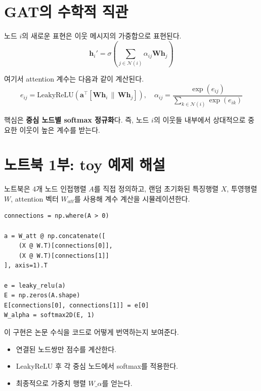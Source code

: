 \documentclass[11pt,a4paper]{article}
\begin{document}
\section{GAT의 수학적 직관}

노드 $i$의 새로운 표현은 이웃 메시지의 가중합으로 표현된다.
\[
\mathbf{h}_i' = \sigma\left(\sum_{j\in\mathcal{N}(i)} \alpha_{ij}\mathbf{W}\mathbf{h}_j\right)
\]

여기서 attention 계수는 다음과 같이 계산된다.
\[
e_{ij} = \text{LeakyReLU}(\mathbf{a}^{\top}[\mathbf{W}\mathbf{h}_i\,\|\,\mathbf{W}\mathbf{h}_j]),
\quad
\alpha_{ij}=\frac{\exp(e_{ij})}{\sum_{k\in\mathcal{N}(i)}\exp(e_{ik})}
\]

핵심은 \textbf{중심 노드별 softmax 정규화}다. 즉, 노드 $i$의 이웃들 내부에서 상대적으로 중요한 이웃이 높은 계수를 받는다.

\section{노트북 1부: toy 예제 해설}

노트북은 4개 노드 인접행렬 $A$를 직접 정의하고, 랜덤 초기화된 특징행렬 $X$, 투영행렬 $W$, attention 벡터 $W_{att}$를 사용해 계수 계산을 시뮬레이션한다.

\begin{lstlisting}
connections = np.where(A > 0)

a = W_att @ np.concatenate([
    (X @ W.T)[connections[0]],
    (X @ W.T)[connections[1]]
], axis=1).T

e = leaky_relu(a)
E = np.zeros(A.shape)
E[connections[0], connections[1]] = e[0]
W_alpha = softmax2D(E, 1)
\end{lstlisting}

이 구현은 논문 수식을 코드로 어떻게 번역하는지 보여준다.
\begin{itemize}[leftmargin=*]
  \item 연결된 노드쌍만 점수를 계산한다.
  \item LeakyReLU 후 각 중심 노드에서 softmax를 적용한다.
  \item 최종적으로 가중치 행렬 $W\_\alpha$를 얻는다.
\end{itemize}
\end{document}
